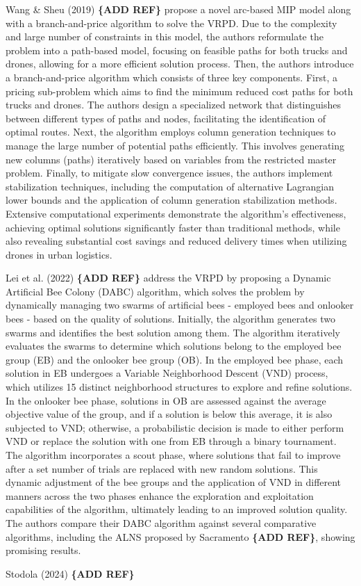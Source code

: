 \documentclass{article}
\begin{document}
	\par 
	Wang \& Sheu (2019) \textbf{\{ADD REF\}} propose a novel arc-based MIP model along with a branch-and-price algorithm to solve the VRPD. Due to the complexity and large number of constraints in this model, the authors reformulate the problem into a path-based model, focusing on feasible paths for both trucks and drones, allowing for a more efficient solution process. Then, the authors introduce a branch-and-price algorithm which consists of three key components. First, a pricing sub-problem which aims to find the minimum reduced cost paths for both trucks and drones. The authors design a specialized network that distinguishes between different types of paths and nodes, facilitating the identification of optimal routes. Next, the algorithm employs column generation techniques to manage the large number of potential paths efficiently. This involves generating new columns (paths) iteratively based on variables from the restricted master problem. Finally, to mitigate slow convergence issues, the authors implement stabilization techniques, including the computation of alternative Lagrangian lower bounds and the application of column generation stabilization methods. Extensive computational experiments demonstrate the algorithm's effectiveness, achieving optimal solutions significantly faster than traditional methods, while also revealing substantial cost savings and reduced delivery times when utilizing drones in urban logistics.
	\par 
	Lei et al. (2022) \textbf{\{ADD REF\}} address the VRPD by proposing a Dynamic Artificial Bee Colony (DABC) algorithm, which solves the problem by dynamically managing two swarms of artificial bees - employed bees and onlooker bees - based on the quality of solutions. Initially, the algorithm generates two swarms and identifies the best solution among them. The algorithm iteratively evaluates the swarms to determine which solutions belong to the employed bee group (EB) and the onlooker bee group (OB). In the employed bee phase, each solution in EB undergoes a Variable Neighborhood Descent (VND) process, which utilizes 15 distinct neighborhood structures to explore and refine solutions. In the onlooker bee phase, solutions in OB are assessed against the average objective value of the group, and if a solution is below this average, it is also subjected to VND; otherwise, a probabilistic decision is made to either perform VND or replace the solution with one from EB through a binary tournament. The algorithm incorporates a scout phase, where solutions that fail to improve after a set number of trials are replaced with new random solutions. This dynamic adjustment of the bee groups and the application of VND in different manners across the two phases enhance the exploration and exploitation capabilities of the algorithm, ultimately leading to an improved solution quality. The authors compare their DABC algorithm against several comparative algorithms, including the ALNS proposed by Sacramento \textbf{\{ADD REF\}}, showing promising results.
	\par 
	Stodola (2024) \textbf{\{ADD REF\}}
	\par 
\end{document}
